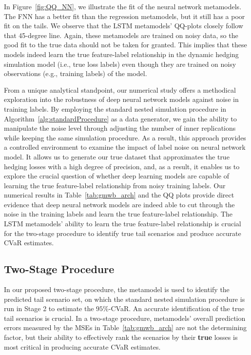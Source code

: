 \documentclass{article}
\begin{document}
In Figure~\ref{fig:QQ_NN}, we illustrate the fit of the neural network metamodels.
The FNN has a better fit than the regression metamodels, but it still has a poor fit on the tails.
We observe that the LSTM metamodels' QQ-plots closely follow that 45-degree line.
Again, these metamodels are trained on noisy data, so the good fit to the true data should not be taken for granted.
This implies that these models indeed learn the true feature-label relationship in the dynamic hedging simulation model (i.e., true loss labels) even though they are trained on noisy observations (e.g., training labels) of the model.

From a unique analytical standpoint, our numerical study offers a methodical exploration into the robustness of deep neural network models against noise in training labels. 
By employing the standard nested simulation procedure in Algorithm~\ref{alg:standardProcedure} as a data generator, we gain the ability to manipulate the noise level through adjusting the number of inner replications while keeping the same simulation procedure.
As a result, this approach provides a controlled environment to examine the impact of label noise on neural network model.
It allows us to generate our true dataset that approximates the true hedging losses with a high degree of precision, and, as a result, it enables us to explore the crucial question of whether deep learning models are capable of learning the true feature-label relationship from noisy training labels.
Our numerical results in Table~\ref{tab:gmwb_arch} and the QQ plots provide direct evidence that deep neural network models are indeed able to cut through the noise in the training labels and learn the true feature-label relationship.
The LSTM metamodels' ability to learn the true feature-label relationship is crucial for the two-stage procedure to identify true tail scenarios and produce accurate CVaR estimates.

\subsection{Two-Stage Procedure}

In our proposed two-stage procedure, the metamodel is used to identify the predicted tail scenario set, on which the standard nested simulation procedure is run in Stage 2 to estimate the $95\%$-CVaR.
An accurate identification of the true tail scenarios is crucial.
In a two-stage procedure, metamodels' overall prediction errors measured by the MSEs in Table~\ref{tab:gmwb_arch} are not the determining factor, but their ability to effectively rank the scenarios by their \textbf{true} losses is most critical in producing accurate CVaR estimates.
\end{document}
